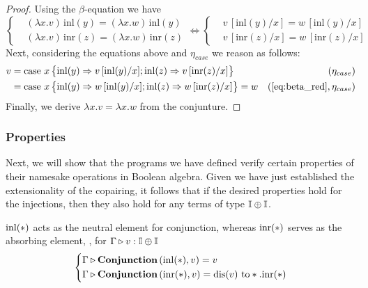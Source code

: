 \begin{proof}
  
Using the $\beta$-equation we have
\begin{equation} \label{eq:beta_red}
  \left\{
\begin{aligned}
&(\lambda x.v)\, \text{inl}(y) = (\lambda x.w)\, \text{inl}(y) \\
&(\lambda x.v)\, \text{inr}(z) =(\lambda x.w)\, \text{inr}(z)
\end{aligned}
\right.
\iff  \left\{
\begin{aligned}
&v\,[\text{inl}(y)/x]  = w\, [\text{inl}(y)/x] \\
&v\,[\text{inr}(z)/x]  = w\, [\text{inr}(z)/x] 
\end{aligned}
\right.
\end{equation}
Next, considering the equations above and  $\eta_{case}$ we reason as follows:
\begin{equation*}
\begin{split}
 v &= \text{case } x  
    \left\{ \begin{aligned}
    \inl(y) \Rightarrow v\,[\text{inl}(y)/x] ;  
    \inl(z) \Rightarrow v\,[\text{inr}(z)/x]
  \end{aligned}  \right\} & (\eta_{case})\\
  & = \text{case } x  
    \left\{ \begin{aligned}
    \inl(y) \Rightarrow w\,[\text{inl}(y)/x] ;  
    \inl(z) \Rightarrow w\,[\text{inr}(z)/x]
  \end{aligned}  \right\} = w & (\text{\autoref{eq:beta_red}},\eta_{case})
\end{split}
\end{equation*}
Finally, we derive $ \lambda x.v = \lambda x.w$ from the conjunture.
\end{proof}

\vspace{5pt}

\subsubsection{Properties}

Next, we will show that the programs we have defined verify certain properties of their namesake operations in Boolean algebra. Given we have just established the extensionality of the copairing, it follows that if the desired properties hold for the injections, then they also hold for any terms of type $\mathbb{I} \oplus \mathbb{I}$.

  \begin{lemma} \label{lemma:inl_neutral}
     $\mathrm{inl}(*)$ acts as the neutral element for conjunction, whereas $\mathrm{inr}(*)$ serves as the absorbing element, \ie,  for $ \Gamma \triangleright v: \mathbb{I} \oplus \mathbb{I}$
     \[
      \left\{
      \begin{aligned}
      & \Gamma \triangleright \textbf{Conjunction} \, (\mathrm{inl}(*),v) = v  \\
      & \Gamma \triangleright \textbf{Conjunction} \, (\mathrm{inr}(*), v) = \text{dis}(v) \text{ to} *. \mathrm{inr}(*)
      \end{aligned}
      \right.
      \]
  \end{lemma}


